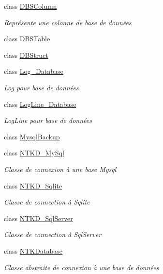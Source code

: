 \begin{DoxyCompactItemize}
\item 
class \mbox{\hyperlink{class_n_t_k_1_1_database_1_1_d_b_s_column}{D\+B\+S\+Column}}
\begin{DoxyCompactList}\small\item\em Représente une colonne de base de données \end{DoxyCompactList}\item 
class \mbox{\hyperlink{class_n_t_k_1_1_database_1_1_d_b_s_table}{D\+B\+S\+Table}}
\item 
class \mbox{\hyperlink{class_n_t_k_1_1_database_1_1_d_b_struct}{D\+B\+Struct}}
\item 
class \mbox{\hyperlink{class_n_t_k_1_1_database_1_1_log___database}{Log\+\_\+\+Database}}
\begin{DoxyCompactList}\small\item\em Log pour base de données \end{DoxyCompactList}\item 
class \mbox{\hyperlink{class_n_t_k_1_1_database_1_1_log_line___database}{Log\+Line\+\_\+\+Database}}
\begin{DoxyCompactList}\small\item\em Log\+Line pour base de données \end{DoxyCompactList}\item 
class \mbox{\hyperlink{class_n_t_k_1_1_database_1_1_mysql_backup}{Mysql\+Backup}}
\item 
class \mbox{\hyperlink{class_n_t_k_1_1_database_1_1_n_t_k_d___my_sql}{N\+T\+K\+D\+\_\+\+My\+Sql}}
\begin{DoxyCompactList}\small\item\em Classe de connexion à une base Mysql \end{DoxyCompactList}\item 
class \mbox{\hyperlink{class_n_t_k_1_1_database_1_1_n_t_k_d___sqlite}{N\+T\+K\+D\+\_\+\+Sqlite}}
\begin{DoxyCompactList}\small\item\em Classe de connection à Sqlite \end{DoxyCompactList}\item 
class \mbox{\hyperlink{class_n_t_k_1_1_database_1_1_n_t_k_d___sql_server}{N\+T\+K\+D\+\_\+\+Sql\+Server}}
\begin{DoxyCompactList}\small\item\em Classe de connection à Sql\+Server \end{DoxyCompactList}\item 
class \mbox{\hyperlink{class_n_t_k_1_1_database_1_1_n_t_k_database}{N\+T\+K\+Database}}
\begin{DoxyCompactList}\small\item\em Classe abstraite de connexion à une base de données \end{DoxyCompactList}\end{DoxyCompactItemize}
